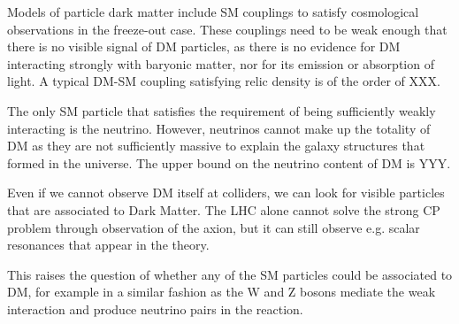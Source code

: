 
Models of particle dark matter include SM couplings to satisfy cosmological observations in the freeze-out case. These couplings need to be weak enough that there is no visible signal of DM particles, as there is no evidence for DM interacting strongly with baryonic matter, nor for its emission or absorption of light. A typical DM-SM coupling satisfying relic density is of the order of XXX. 

The only SM particle that satisfies the requirement of being sufficiently weakly interacting is the neutrino. However, neutrinos cannot make up the totality of DM as they are not sufficiently massive to explain the galaxy structures that formed in the universe. %
The upper bound on the neutrino content of DM is YYY. 

Even if we cannot observe DM itself at colliders, we can look for visible particles that are associated to Dark Matter. The LHC alone cannot solve the strong CP problem through observation of the axion, but it can still observe e.g. scalar resonances that appear in the theory. 

This raises the question of whether any of the SM particles could be associated to DM, for example in a similar fashion as the W and Z bosons mediate the weak interaction and produce neutrino pairs in the reaction. 




